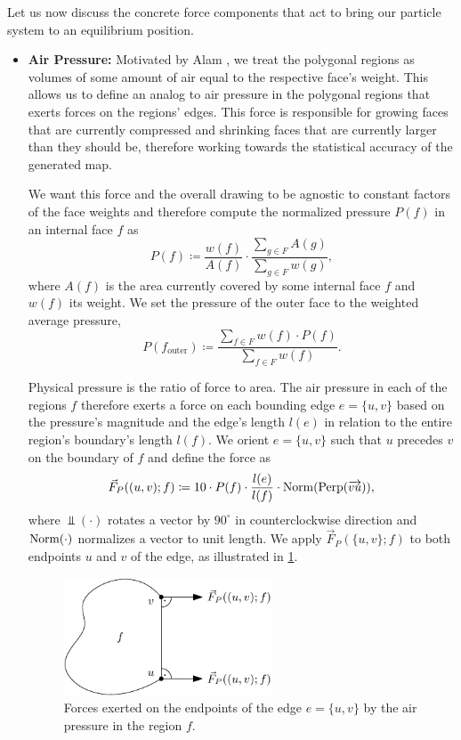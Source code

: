 Let us now discuss the concrete force components that act to bring our particle system to an equilibrium position.
%
\begin{itemize}
\item \textbf{Air Pressure:} %
Motivated by Alam \etal{} \cite{alam2013computing}, we treat the polygonal regions as volumes of some amount of air equal to the respective face's weight.
This allows us to define an analog to air pressure in the polygonal regions that exerts forces on the regions' edges.
This force is responsible for growing faces that are currently compressed and shrinking faces that are currently larger than they should be, therefore working towards the statistical accuracy of the generated map.

We want this force and the overall drawing to be agnostic to constant factors of the face weights and therefore compute the normalized pressure $P(f)$ in an internal face $f$ as
%
\begin{equation*}
	P(f) \coloneqq \frac{w(f)}{A(f)} \cdot \frac{\sum_{g \in F}{A(g)}}{\sum_{g \in F}{w(g)}},
\end{equation*}
%
where $A(f)$ is the area currently covered by some internal face $f$ and $w(f)$ its weight.
We set the pressure of the outer face to the weighted average pressure, \ie{}
%
\begin{equation*}
	P(f_\text{outer}) \coloneqq \frac{\sum_{f \in F}{w(f) \cdot P(f)}}{\sum_{f \in F}{w(f)}}.
\end{equation*}

Physical pressure is the ratio of force to area.
The air pressure in each of the regions $f$ therefore exerts a force on each bounding edge $e = \{u,v\}$ based on the pressure's magnitude and the edge's length $l(e)$ in relation to the entire region's boundary's length $l(f)$.
We orient $e = \{u,v\}$ such that $u$ precedes $v$ on the boundary of $f$ and define the force as
%
\begin{equation}
	\vec{F}_P((u,v);f) \coloneqq
	10 \cdot P(f)\cdot\frac{l(e)}{l(f)}
	\cdot \operatorname{Norm}(\operatorname{Perp}(\overrightarrow{vu}))
	,
\end{equation}
%
where $\Perp(\cdot)$ rotates a vector by $90^\circ$ in counterclockwise direction and $\operatorname{Norm}(\cdot)$ normalizes a vector to unit length.
We apply $\vec{F}_P(\{u,v\};f)$ to both endpoints $u$ and $v$ of the edge, as illustrated in \cref{fig:drawing-forces-air-pressure}.

\begin{figure}[H]
	\centering
	\includegraphics[height=35mm]{Resources/Drawing-Forces-AirPressure.pdf}
	\caption{Forces exerted on the endpoints of the edge $e = \{u,v\}$ by the air pressure in the region $f$.}
	\label{fig:drawing-forces-air-pressure}
\end{figure}


\end{itemize}
